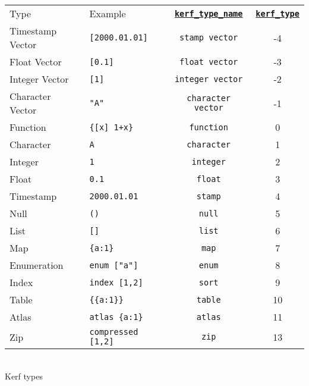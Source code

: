 \documentclass{article}
\newcommand{\primu}[2]{\hyperref[prim:#2]{\textbf{\texttt{#1}}}}
\begin{document}
\begin{table}[h]
	\centering
	\begin{tabular}{| l | l | c | c |}
		\hline
		\cellcolor{tableHeaderColor} Type &
		\cellcolor{tableHeaderColor} Example &
		\cellcolor{tableHeaderColor} \primu{kerf\_type\_name}{kerfTypeName} &
		\cellcolor{tableHeaderColor} \primu{kerf\_type}{kerfType} \\
		Timestamp Vector & \texttt{[2000.01.01]}       & \texttt{stamp vector}     & -4 \\
		Float Vector     & \texttt{[0.1]}              & \texttt{float vector}     & -3 \\
		Integer Vector   & \texttt{[1]}                & \texttt{integer vector}   & -2 \\
		Character Vector & \texttt{"A"}                & \texttt{character vector} & -1 \\
		Function         & \texttt{\{[x] 1+x\}}        & \texttt{function}         &  0 \\
		Character        & \texttt{\textasciigrave{}A} & \texttt{character}        &  1 \\
		Integer          & \texttt{1}                  & \texttt{integer}          &  2 \\
		Float            & \texttt{0.1}                & \texttt{float}            &  3 \\
		Timestamp        & \texttt{2000.01.01}         & \texttt{stamp}            &  4 \\
		Null             & \texttt{()}                 & \texttt{null}             &  5 \\
		List             & \texttt{[]}                 & \texttt{list}             &  6 \\
		Map              & \texttt{\{a:1\}}            & \texttt{map}              &  7 \\
		Enumeration      & \texttt{enum ["a"]}         & \texttt{enum}             &  8 \\
		Index            & \texttt{index [1,2]}        & \texttt{sort}             &  9 \\
		Table            & \texttt{\{\{a:1\}\}}        & \texttt{table}            & 10 \\
		Atlas            & \texttt{atlas \{a:1\}}      & \texttt{atlas}            & 11 \\
		Zip              & \texttt{compressed [1,2]}   & \texttt{zip}              & 13 \\
		\hline
	\end{tabular}
	\\ \bigskip Kerf types
\end{table}
\end{document}
